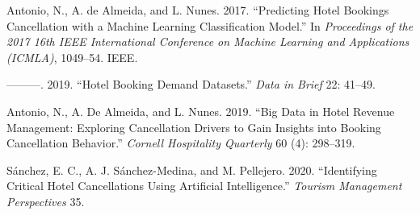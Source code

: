 \documentclass[
  letterpaper,
  DIV=11,
  numbers=noendperiod]{scrartcl}
\newlength{\cslhangindent}
\newenvironment{CSLReferences}[2] %
 {\begin{list}{}{%
  \setlength{\itemindent}{0pt}
  \setlength{\leftmargin}{0pt}
  \setlength{\parsep}{0pt}
  \ifodd #1
   \setlength{\leftmargin}{\cslhangindent}
   \setlength{\itemindent}{-1\cslhangindent}
  \fi
  \setlength{\itemsep}{#2\baselineskip}}}
 {\end{list}}
\begin{document}
\label{refs}
\begin{CSLReferences}{1}{0}
Antonio, N., A. de Almeida, and L. Nunes. 2017. {``Predicting Hotel
Bookings Cancellation with a Machine Learning Classification Model.''}
In \emph{Proceedings of the 2017 16th IEEE International Conference on
Machine Learning and Applications (ICMLA)}, 1049--54. IEEE.

---------. 2019. {``Hotel Booking Demand Datasets.''} \emph{Data in
Brief} 22: 41--49.

Antonio, N., A. De Almeida, and L. Nunes. 2019. {``Big Data in Hotel
Revenue Management: Exploring Cancellation Drivers to Gain Insights into
Booking Cancellation Behavior.''} \emph{Cornell Hospitality Quarterly}
60 (4): 298--319.

Sánchez, E. C., A. J. Sánchez-Medina, and M. Pellejero. 2020.
{``Identifying Critical Hotel Cancellations Using Artificial
Intelligence.''} \emph{Tourism Management Perspectives} 35.

\end{CSLReferences}
\end{document}
